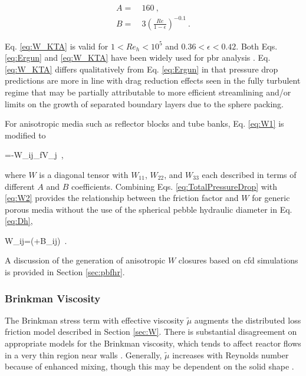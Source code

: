 \begin{subequations}
\label{eq:W_KTA}
\begin{align}
A=&\ 160\ ,\\
B=&\ 3\left(\frac{Re}{1-\epsilon}\right)^{-0.1}\ .
\end{align}
\end{subequations}

\noindent Eq. \eqref{eq:W_KTA} is valid for \(1<Re_h<10^5\) and \(0.36<\epsilon<0.42\). Both Eqs. \eqref{eq:Ergun} and \eqref{eq:W_KTA} have been widely used for \gls{pbr} analysis \cite{gao, becker, becker2003, auwerda_2011,kececioglu,avigni,suikkanen,ge,scarlat,y_li,cai}. Eq. \eqref{eq:W_KTA} differs qualitatively from Eq. \eqref{eq:Ergun} in that pressure drop predictions are more in line with drag reduction effects seen in the fully turbulent regime \cite{fand,kececioglu,KTA,barree,nield_2000} that may be partially attributable to more efficient streamlining and/or limits on the growth of separated boundary layers due to the sphere packing.

For anisotropic media such as reflector blocks and tube banks, Eq. \eqref{eq:W1} is modified to

\beq
\label{eq:W2}
\epsilon{}=-W_{ij}\rho_fV_j\ ,
\eeq

\noindent where \(W\) is a diagonal tensor with \(W_{11}\), \(W_{22}\), and \(W_{33}\) each described in terms of different \(A\) and \(B\) coefficients. Combining Eqs. \eqref{eq:TotalPressureDrop} with \eqref{eq:W2} provides the relationship between the friction factor and \(W\) for generic porous media without the use of the spherical pebble hydraulic diameter in Eq. \eqref{eq:Dh},

\beq
\label{eq:W3}
W_{ij}=\left(+B_{ij}\right)\ .
\eeq

\noindent A discussion of the generation of anisotropic \(W\) closures based on \gls{cfd} simulations is provided in Section \ref{sec:pbfhr}. 

\subsubsection{Brinkman Viscosity}
\label{sec:BrinkmanMu}

The Brinkman stress term with effective viscosity \(\tilde{\mu}\) augments the distributed loss friction model described in Section \ref{sec:W}. There is substantial disagreement on appropriate models for the Brinkman viscosity, which tends to affect reactor flows in a very thin region near walls \cite{auwerda_2011,giese,vafai,tecdoc1163}. Generally, \(\tilde{\mu}\) increases with Reynolds number because of enhanced mixing, though this may be dependent on the solid shape \cite{giese}. 

